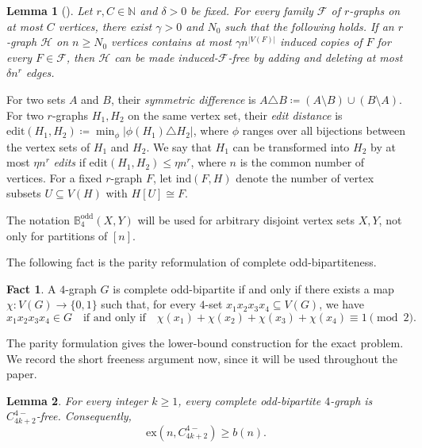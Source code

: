 \documentclass[10pt,a4paper]{article}
\theoremstyle{plain}
\newtheorem{lemma}[lemma]{Lemma}
\theoremstyle{definition}
\newtheorem{fact}[fact]{Fact}
\newcommand{\ex}{\mathrm{ex}}
\newcommand{\ind}{\mathrm{ind}}
\begin{document}
\begin{lemma}[{\cite{ARS07,RS09}}]\label{LEM:removal_lemma}
Let $r,C\in\mathbb N$ and $\delta>0$ be fixed.  For every family $\mathcal F$ of $r$-graphs on at most $C$ vertices, there exist $\gamma>0$ and $N_0$ such that the following holds.  If an $r$-graph $\mathcal H$ on $n\ge N_0$ vertices contains at most $\gamma n^{|V(F)|}$ induced copies of $F$ for every $F\in\mathcal F$, then $\mathcal H$ can be made induced-$\mathcal F$-free by adding and deleting at most $\delta n^r$ edges.
\end{lemma}

For two sets $A$ and $B$, their \emph{symmetric difference} is $A\triangle B\coloneqq (A\setminus B)\cup(B\setminus A)$. 
For two $r$-graphs $H_1,H_2$ on the same vertex set, their \emph{edit distance} is $\mathrm{edit}(H_1, H_2) \coloneqq \min_{\phi}|\phi(H_1) \triangle H_2|$, where $\phi$ ranges over all bijections between the vertex sets of $H_1$ and $H_2$.  We say that $H_1$ can be transformed into $H_2$ by at most $\eta n^r$ \emph{edits} if $\mathrm{edit}(H_1, H_2) \le \eta n^r$, where $n$ is the common number of vertices.  For a fixed $r$-graph $F$, let $\ind(F,H)$ denote the number of vertex subsets $U\subseteq V(H)$ with $H[U]\cong F$.

The notation $\mathbb{B}_4^{\mathrm{odd}}(X,Y)$ will be used for arbitrary disjoint vertex sets $X,Y$, not only for partitions of $[n]$.

The following fact is the parity reformulation of complete odd-bipartiteness.

\begin{fact}\label{FACT:odd-label}
A $4$-graph $G$ is complete odd-bipartite if and only if there exists a map $\chi:V(G)\to\{0,1\}$ such that, for every $4$-set $x_1x_2x_3x_4\subseteq V(G)$, we have
\begin{equation}\label{EQ:odd_label}
x_1x_2x_3x_4\in G
\quad\text{if and only if}\quad
\chi(x_1)+\chi(x_2)+\chi(x_3)+\chi(x_4)\equiv 1\pmod 2.
\end{equation}
\end{fact}

The parity formulation gives the lower-bound construction for the exact problem.
We record the short freeness argument now, since it will be used throughout the paper.

\begin{lemma}\label{lem:odd-bip-Fk-free}
For every integer $k\ge 1$, every complete odd-bipartite $4$-graph is
$C_{4k+2}^{4-}$-free. Consequently,
\[
\ex(n,C_{4k+2}^{4-})\ge b(n).
\]
\end{lemma}
\end{document}
